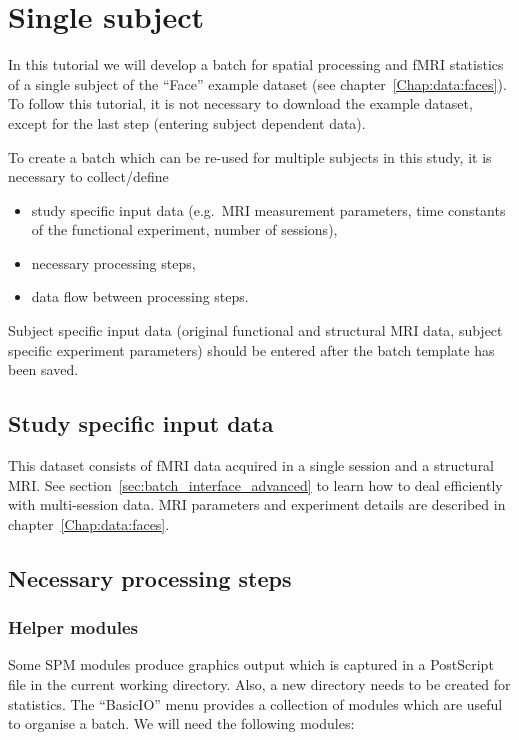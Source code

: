 \section{Single subject}

In this tutorial we will develop a batch for spatial processing and fMRI
statistics of a single subject of the ``Face'' example dataset (see
chapter~\ref{Chap:data:faces}). To follow this tutorial, it is not necessary to
download the example dataset, except for the last step (entering subject
dependent data).

To create a batch which can be re-used for multiple subjects in this study, it
is necessary to collect/define
\begin{itemize}
\item study specific input data (e.g.\ MRI measurement parameters, time
  constants of the functional experiment, number of sessions),
\item necessary processing steps,
\item data flow between processing steps.
\end{itemize}
Subject specific input data (original functional and structural MRI data,
subject specific experiment parameters) should be entered after the batch
template has been saved.

\subsection{Study specific input data}

This dataset consists of fMRI data acquired in a single session and a
structural MRI. See section~\ref{sec:batch_interface_advanced} to learn how to
deal efficiently with multi-session data. MRI parameters and experiment
details are described in chapter~\ref{Chap:data:faces}.

\subsection{Necessary processing steps}

\subsubsection{Helper modules}

Some SPM modules produce graphics output which is captured in a PostScript
file in the current working directory. Also, a new directory needs to be
created for statistics. The ``BasicIO'' menu provides a collection of modules
which are useful to organise a batch. We will need the following modules:

